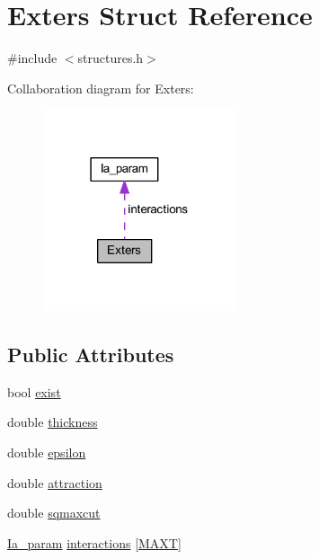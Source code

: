 \hypertarget{struct_exters}{\section{Exters Struct Reference}
\label{struct_exters}
}


{\ttfamily \#include $<$structures.\+h$>$}



Collaboration diagram for Exters\+:\nopagebreak
\begin{figure}[H]
\begin{center}
\leavevmode
\includegraphics[width=162pt]{struct_exters__coll__graph}
\end{center}
\end{figure}
\subsection*{Public Attributes}
\begin{DoxyCompactItemize}
\item 
bool \hyperlink{struct_exters_a78d759bd9da50ad5c4669dae9c6172ff}{exist}
\item 
double \hyperlink{struct_exters_a6ac0235fe365f41ca035957b748c9564}{thickness}
\item 
double \hyperlink{struct_exters_ac6920553910e27bde3188120889e8381}{epsilon}
\item 
double \hyperlink{struct_exters_a3ace0154ce9823eaafe3e7d7c0ae71bc}{attraction}
\item 
double \hyperlink{struct_exters_ae4e012e33e40f87ef88b08072bdf2d07}{sqmaxcut}
\item 
\hyperlink{struct_ia__param}{Ia\+\_\+param} \hyperlink{struct_exters_adecb24b99a4014cd45182172733493b7}{interactions} \mbox{[}\hyperlink{macros_8h_a3f79fdecc884eb98c97d1bdc77455295}{M\+A\+X\+T}\mbox{]}
\end{DoxyCompactItemize}


